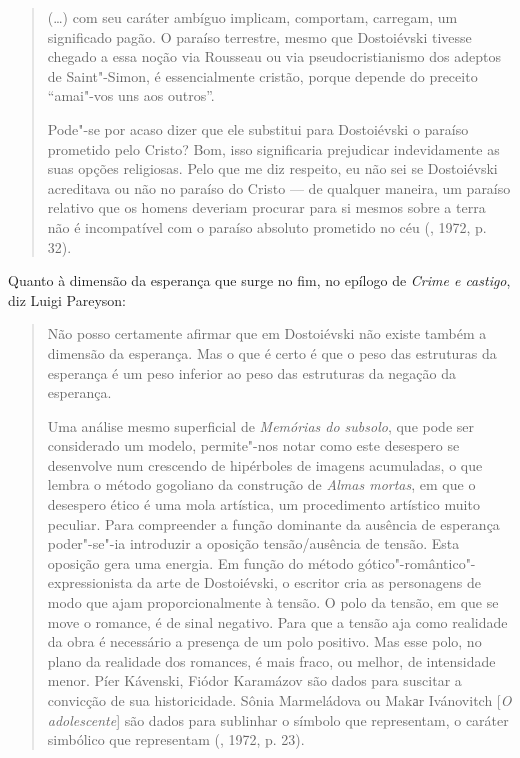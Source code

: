 {{\begin{quote}
(\ldots{}) com seu caráter ambíguo implicam, comportam, carregam, um
significado pagão. O paraíso terrestre, mesmo que Dostoiévski tivesse
chegado a essa noção via Rousseau ou via pseudocristianismo dos adeptos
de Saint"-Simon, é essencialmente cristão, porque depende do preceito
``amai"-vos uns aos outros''.

Pode"-se por acaso dizer que ele substitui para Dostoiévski o paraíso
prometido pelo Cristo? Bom, isso significaria prejudicar indevidamente
as suas opções religiosas. Pelo que me diz respeito, eu não sei se
Dostoiévski acreditava ou não no paraíso do Cristo --- de qualquer
maneira, um paraíso relativo que os homens deveriam procurar para si
mesmos sobre a terra não é incompatível com o paraíso absoluto prometido
no céu (, 1972, p. 32).
\end{quote}

Quanto à dimensão da esperança que surge no fim, no epílogo de
\emph{Crime e castigo}, diz Luigi Pareyson:

\begin{quote}
Não posso certamente afirmar que em Dostoiévski não existe também a
dimensão da esperança. Mas o que é certo é que o peso das estruturas da
esperança é um peso inferior ao peso das estruturas da negação da
esperança.

Uma análise mesmo superficial de \emph{Memórias do subsolo}, que pode
ser considerado um modelo, permite"-nos notar como este desespero se
desenvolve num crescendo de hipérboles de imagens acumuladas, o que
lembra o método gogoliano da construção de \emph{Almas mortas}, em que o
desespero ético é uma mola artística, um procedimento artístico muito
peculiar. Para compreender a função dominante da ausência de esperança
poder"-se"-ia introduzir a oposição tensão/ausência de tensão. Esta
oposição gera uma energia. Em função do método
gótico"-romântico"-expressionista da arte de Dostoiévski, o escritor cria
as personagens de modo que ajam proporcionalmente à tensão. O polo da
tensão, em que se move o romance, é de sinal negativo. Para que a tensão
aja como realidade da obra é necessário a presença de um polo positivo.
Mas esse polo, no plano da realidade dos romances, é mais fraco, ou
melhor, de intensidade menor. Píer Kávenski, Fiódor Karamázov são dados
para suscitar a convicção de sua historicidade. Sônia Marmeládova ou
Makаr Ivánovitch [\emph{O adolescente}] são dados para sublinhar o
símbolo que representam, o caráter simbólico que representam (, 1972, p. 23).
\end{quote}

}}
